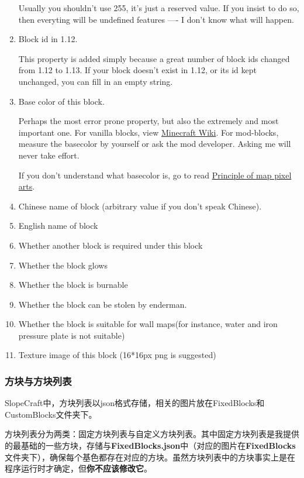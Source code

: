 \documentclass{article}
\begin{document}
\begin{enumerate}
   Usually you shouldn't use 255, it's just a reserved value. If you insist to do so, then everyting will be undefined features ---- I don't know what will happen.

   \item Block id in 1.12.
   
   This property is added simply because a great number of block ids changed from 1.12 to 1.13. If your block doesn't exist in 1.12, or its id kept unchanged, you can fill in an empty string.
   
   \item Base color of this block.
   
   Perhaps the most error prone property, but also the extremely and most important one. For vanilla blocks, view \href{https://minecraft.fandom.com/wiki/Map_item_format}{Minecraft Wiki}. For mod-blocks, measure the basecolor by yourself or ask the mod developer. Asking me will never take effort.
   
   If you don't understand what basecolor is, go to read \href{https://github.com/ToKiNoBug/SlopeCraftTutorial/blob/main/BasicPrinciple/Principle%20of%20map%20pixel%20arts.md}{Principle of map pixel arts}.

   \item Chinese name of block (arbitrary value if you don't speak Chinese).
   \item English name of block
   \item Whether another block is required under this block
   \item Whether the block glows
   \item Whether the block is burnable
   \item Whether the block can be stolen by enderman.
   \item Whether the block is suitable for wall maps(for instance, water and iron pressure plate is not suitable)
   \item Texture image of this block (16*16px png is suggested)  
   \end{enumerate}

   \subsubsection{方块与方块列表}
   SlopeCraft中，方块列表以json格式存储，相关的图片放在FixedBlocks和CustomBlocks文件夹下。
   
   方块列表分为两类：固定方块列表与自定义方块列表。其中固定方块列表是我提供的最基础的一些方块，存储与\textbf{FixedBlocks.json}中（对应的图片在\textbf{FixedBlocks}文件夹下），确保每个基色都存在对应的方块。虽然方块列表中的方块事实上是在程序运行时才确定，但\textbf{你不应该修改它}。
   
\end{document}
